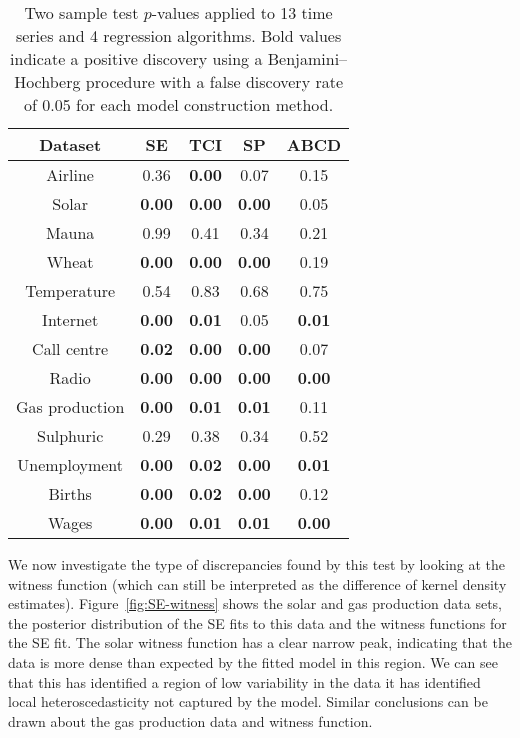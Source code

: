 \begin{table}[ht]
\center
\begin{tabular}{|c|c|c|c|c|}
\hline
Dataset & SE & TCI & SP & ABCD \\
\hline
Airline        & 0.36 & \bf{0.00} & 0.07 & 0.15 \\
Solar          & \bf{0.00} & \bf{0.00} & \bf{0.00} & 0.05 \\
Mauna          & 0.99 & 0.41 & 0.34 & 0.21 \\
Wheat          & \bf{0.00} & \bf{0.00} & \bf{0.00} & 0.19 \\
Temperature    & 0.54 & 0.83 & 0.68 & 0.75 \\
Internet       & \bf{0.00} & \bf{0.01} & 0.05 & \bf{0.01} \\
Call centre    & \bf{0.02} & \bf{0.00} & \bf{0.00} & 0.07 \\
Radio          & \bf{0.00} & \bf{0.00} & \bf{0.00} & \bf{0.00} \\
Gas production & \bf{0.00} & \bf{0.01} & \bf{0.01} & 0.11 \\
Sulphuric      & 0.29 & 0.38 & 0.34 & 0.52 \\
Unemployment   & \bf{0.00} & \bf{0.02} & \bf{0.00} & \bf{0.01} \\
Births         & \bf{0.00} & \bf{0.02} & \bf{0.00} & 0.12 \\
Wages          & \bf{0.00} & \bf{0.01} & \bf{0.01} & \bf{0.00} \\
\hline
\end{tabular}
\caption{Two sample test $p$-values applied to 13 time series and 4 regression algorithms.
Bold values indicate a positive discovery using a Benjamini--Hochberg procedure with a false discovery rate of 0.05 for each model construction method.}
\label{table:ABCD-p-values}
\end{table}

We now investigate the type of discrepancies found by this test by looking at the witness function (which can still be interpreted as the difference of kernel density estimates).
Figure~\ref{fig:SE-witness} shows the solar and gas production data sets, the posterior distribution of the SE fits to this data and the witness functions for the SE fit.
The solar witness function has a clear narrow peak, indicating that the data is more dense than expected by the fitted model in this region.
We can see that this has identified a region of low variability in the data \ie it has identified local heteroscedasticity not captured by the model.
Similar conclusions can be drawn about the gas production data and witness function.

